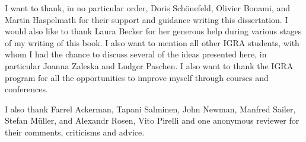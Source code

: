 \addchap{\lsAcknowledgementTitle}

I want to thank, in no particular order, Doris Schönefeld, Olivier Bonami, and Martin Haspelmath for their support and guidance writing this dissertation. I would also like to thank Laura Becker for her generous help during various stages of my writing of this book. I  also want to mention all other IGRA students, with whom I had the chance to discuss several of the ideas presented here, in particular Joanna Zaleska and Ludger Paschen. I also want to thank the IGRA program for all the opportunities to improve myself through courses and conferences.

I also thank Farrel Ackerman, Tapani Salminen, John Newman, Manfred Sailer, Stefan Müller, and Alexandr Rosen, Vito Pirelli and one anonymous reviewer for their comments, criticisms and advice.




